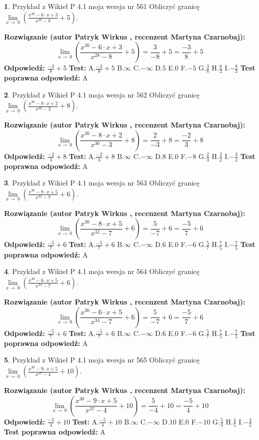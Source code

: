 \documentclass[12pt, a4paper]{article}
\theoremstyle{definition} %
\newtheorem{zad}{}
\newcommand{\zadStart}[1]{\begin{zad}#1\newline}
\newcommand{\zadStop}{\end{zad}}
\newcommand{\rozwStart}[2]{\noindent \textbf{Rozwiązanie (autor #1 , recenzent #2): }\newline}
\newcommand{\rozwStop}{\newline}
\newcommand{\odpStart}{\noindent \textbf{Odpowiedź:}\newline}
\newcommand{\odpStop}{\newline}
\newcommand{\testStart}{\noindent \textbf{Test:}\newline}
\newcommand{\testStop}{\newline}
\newcommand{\kluczStart}{\noindent \textbf{Test poprawna odpowiedź:}\newline}
\newcommand{\kluczStop}{\newline}
\begin{document}
\zadStart{Przykład z Wikieł P 4.1 moja wersja nr 561}
Obliczyć granicę $\lim\limits_{x\to\ 0}(\frac{x^{30}-6 \cdot x +3}{x^{28}-8}+5)$.
\zadStop
\rozwStart{Patryk Wirkus}{Martyna Czarnobaj}
$$\lim\limits_{x\to\ 0}(\frac{x^{30}-6 \cdot x +3}{x^{28}-8}+5)=\frac{3}{-8}+5=\frac{-3}{8}+5$$
\rozwStop
\odpStart
$\frac{-3}{8}+5$
\odpStop
\testStart
A.$\frac{-3}{8}+5$
B.$\infty$
C.$-\infty$
D.$5$
E.$0$
F.$-5$
G.$\frac{3}{8}$
H.$\frac{8}{3}$
I.$-\frac{8}{3}$
\testStop
\kluczStart
A
\kluczStop



\zadStart{Przykład z Wikieł P 4.1 moja wersja nr 562}
Obliczyć granicę $\lim\limits_{x\to\ 0}(\frac{x^{30}-8 \cdot x +2}{x^{30}-3}+8)$.
\zadStop
\rozwStart{Patryk Wirkus}{Martyna Czarnobaj}
$$\lim\limits_{x\to\ 0}(\frac{x^{30}-8 \cdot x +2}{x^{30}-3}+8)=\frac{2}{-3}+8=\frac{-2}{3}+8$$
\rozwStop
\odpStart
$\frac{-2}{3}+8$
\odpStop
\testStart
A.$\frac{-2}{3}+8$
B.$\infty$
C.$-\infty$
D.$8$
E.$0$
F.$-8$
G.$\frac{2}{3}$
H.$\frac{3}{2}$
I.$-\frac{3}{2}$
\testStop
\kluczStart
A
\kluczStop



\zadStart{Przykład z Wikieł P 4.1 moja wersja nr 563}
Obliczyć granicę $\lim\limits_{x\to\ 0}(\frac{x^{30}-8 \cdot x +5}{x^{32}-7}+6)$.
\zadStop
\rozwStart{Patryk Wirkus}{Martyna Czarnobaj}
$$\lim\limits_{x\to\ 0}(\frac{x^{30}-8 \cdot x +5}{x^{32}-7}+6)=\frac{5}{-7}+6=\frac{-5}{7}+6$$
\rozwStop
\odpStart
$\frac{-5}{7}+6$
\odpStop
\testStart
A.$\frac{-5}{7}+6$
B.$\infty$
C.$-\infty$
D.$6$
E.$0$
F.$-6$
G.$\frac{5}{7}$
H.$\frac{7}{5}$
I.$-\frac{7}{5}$
\testStop
\kluczStart
A
\kluczStop



\zadStart{Przykład z Wikieł P 4.1 moja wersja nr 564}
Obliczyć granicę $\lim\limits_{x\to\ 0}(\frac{x^{30}-6 \cdot x +5}{x^{34}-7}+6)$.
\zadStop
\rozwStart{Patryk Wirkus}{Martyna Czarnobaj}
$$\lim\limits_{x\to\ 0}(\frac{x^{30}-6 \cdot x +5}{x^{34}-7}+6)=\frac{5}{-7}+6=\frac{-5}{7}+6$$
\rozwStop
\odpStart
$\frac{-5}{7}+6$
\odpStop
\testStart
A.$\frac{-5}{7}+6$
B.$\infty$
C.$-\infty$
D.$6$
E.$0$
F.$-6$
G.$\frac{5}{7}$
H.$\frac{7}{5}$
I.$-\frac{7}{5}$
\testStop
\kluczStart
A
\kluczStop



\zadStart{Przykład z Wikieł P 4.1 moja wersja nr 565}
Obliczyć granicę $\lim\limits_{x\to\ 0}(\frac{x^{30}-9 \cdot x +5}{x^{37}-4}+10)$.
\zadStop
\rozwStart{Patryk Wirkus}{Martyna Czarnobaj}
$$\lim\limits_{x\to\ 0}(\frac{x^{30}-9 \cdot x +5}{x^{37}-4}+10)=\frac{5}{-4}+10=\frac{-5}{4}+10$$
\rozwStop
\odpStart
$\frac{-5}{4}+10$
\odpStop
\testStart
A.$\frac{-5}{4}+10$
B.$\infty$
C.$-\infty$
D.$10$
E.$0$
F.$-10$
G.$\frac{5}{4}$
H.$\frac{4}{5}$
I.$-\frac{4}{5}$
\testStop
\kluczStart
A
\kluczStop
\end{document}
